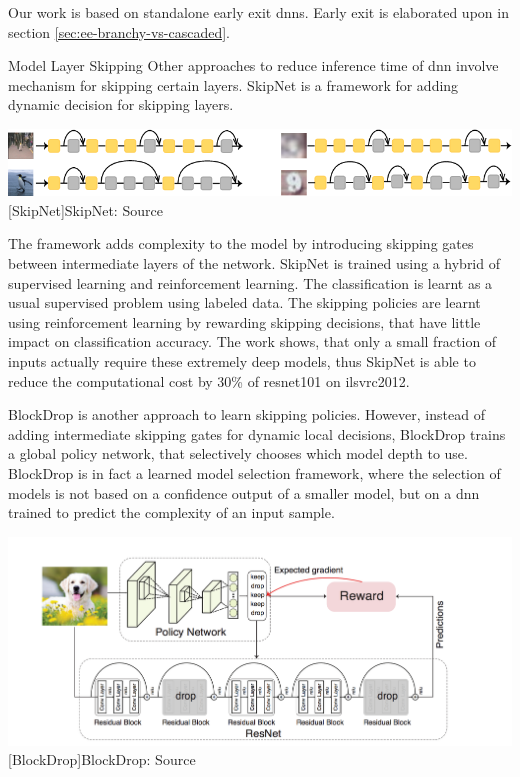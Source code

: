 \begin{enumdescript}
	Our work is based on standalone early exit \gls{dnn}s. Early exit is elaborated upon in section \ref{sec:ee-branchy-vs-cascaded}.
	
	\item[Model Layer Skipping] Other approaches to reduce inference time of \gls{dnn} involve mechanism for skipping certain layers. SkipNet \cite{wang_skipnet:_2017} is a framework for adding dynamic decision for skipping layers. 
	
	\begin{minipage}[t]{\linewidth}    
		\centering                          
		\includegraphics[width=.8\linewidth]{figures/models/skipnet}
		[SkipNet]{SkipNet: Source  \cite{wang_skipnet:_2017}}
	\end{minipage}
	
	The framework adds complexity to the model by introducing skipping gates between intermediate layers of the network. SkipNet is trained using a hybrid of supervised learning and reinforcement learning. The classification is learnt as a usual supervised problem using labeled data. The skipping policies are learnt using reinforcement learning by rewarding skipping decisions, that have little impact on classification accuracy. The work shows, that only a small fraction of inputs actually require these extremely deep models, thus SkipNet is able to reduce the computational cost by 30\% of \gls{resnet}101 on \gls{ilsvrc2012}. 
	
	BlockDrop \cite{wu_blockdrop:_2017} is another approach to learn skipping policies. However, instead of adding intermediate skipping gates for dynamic local decisions, BlockDrop trains a global policy network, that selectively chooses which model depth to use. BlockDrop is in fact a learned model selection framework, where the selection of models is not based on a confidence output of a smaller model, but on a \gls{dnn} trained to predict the complexity of an input sample. 
	
	
	\begin{minipage}[t]{\linewidth}    
		\centering
		\includegraphics[width=\linewidth]{figures/models/blockdrop}
		[BlockDrop]{BlockDrop: Source  \cite{wu_blockdrop:_2017}}
	\end{minipage}
	

\end{enumdescript}
